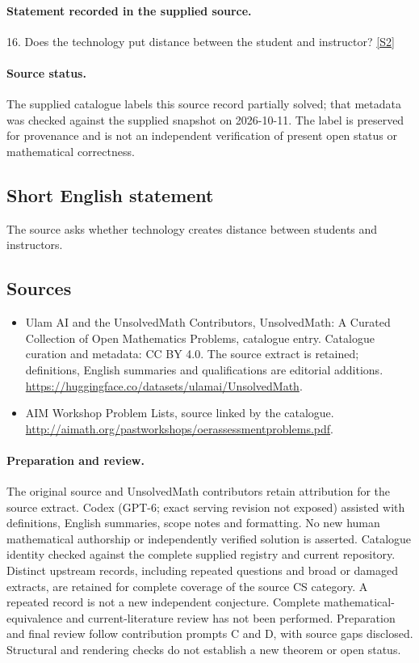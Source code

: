 \documentclass[11pt]{article}
\begin{document}
\paragraph{Statement recorded in the supplied source.}
16. Does the technology put distance between the student and instructor? \href{http://aimath.org/pastworkshops/oerassessmentproblems.pdf}{[S2]}
\paragraph{Source status.}
The supplied catalogue labels this source record partially solved; that metadata was checked against the supplied snapshot on 2026-10-11. The label is preserved for provenance and is not an independent verification of present open status or mathematical correctness.
\subsection{Short English statement}
The source asks whether technology creates distance between students and instructors.
\subsection{Sources}
\begin{itemize}
\item[S1] Ulam AI and the UnsolvedMath Contributors, UnsolvedMath: A Curated Collection of Open Mathematics Problems, catalogue entry. Catalogue curation and metadata: CC BY 4.0. The source extract is retained; definitions, English summaries and qualifications are editorial additions.
\url{https://huggingface.co/datasets/ulamai/UnsolvedMath}.
\item[S2] AIM Workshop Problem Lists, source linked by the catalogue.
\url{http://aimath.org/pastworkshops/oerassessmentproblems.pdf}.
\end{itemize}
\paragraph{Preparation and review.}
The original source and UnsolvedMath contributors retain attribution for the source extract. Codex (GPT-6; exact serving revision not exposed) assisted with definitions, English summaries, scope notes and formatting. No new human mathematical authorship or independently verified solution is asserted. Catalogue identity checked against the complete supplied registry and current repository. Distinct upstream records, including repeated questions and broad or damaged extracts, are retained for complete coverage of the source CS category. A repeated record is not a new independent conjecture. Complete mathematical-equivalence and current-literature review has not been performed. Preparation and final review follow contribution prompts C and D, with source gaps disclosed. Structural and rendering checks do not establish a new theorem or open status.
\label{end:statement}
\end{document}
